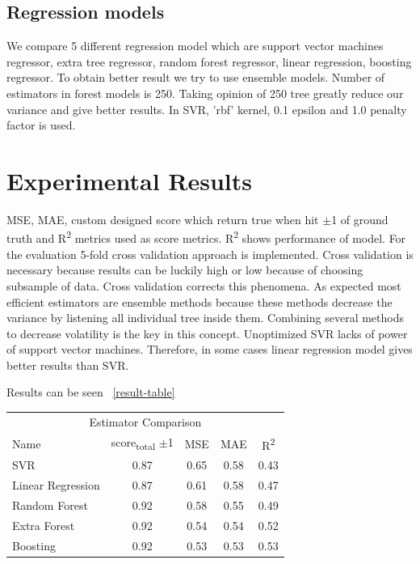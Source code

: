 \documentclass{article}
\begin{document}
\subsection{Regression models}
We compare 5 different regression model which are support vector machines regressor, extra tree regressor, random forest regressor, linear regression, boosting regressor. To obtain better result we try to use ensemble models.
Number of estimators in forest models is 250. Taking opinion of 250 tree greatly reduce our variance and give better results. 
In SVR, 'rbf' kernel, 0.1 epsilon and 1.0 penalty factor is used. 

\section{Experimental Results}
MSE, MAE, custom designed score which return true when hit $\pm$1 of ground truth and R\textsuperscript{2} metrics used as score metrics. R\textsuperscript{2} shows performance of model. For the evaluation 5-fold cross validation approach is implemented. Cross validation is necessary because results can be luckily high or low because of choosing subsample of data. Cross validation corrects this phenomena. As expected most efficient estimators are ensemble methods because these methods decrease the variance by listening all individual tree inside them. Combining several methods to decrease volatility is the key in this concept.
Unoptimized SVR lacks of power of support vector machines. Therefore, in some cases linear regression model gives better results than SVR. 

Results can be seen ~\ref{result-table}

\begin{table}[H]
  
  \centering
{}
{%
  \begin{tabular}{lcccc}
    \toprule
    \multicolumn{5}{c}{Estimator Comparison}                   \\
    \cmidrule{1-5}
    Name     & score\textsubscript{total} $\pm$1     & MSE 	& MAE	&R\textsuperscript{2}\\
    \midrule
    SVR					& 0.87  & 0.65	& 0.58	&0.43 \\
    Linear Regression   & 0.87 	& 0.61 	& 0.58	&0.47 \\
    Random Forest		& 0.92  & 0.58 	& 0.55 	&0.49 \\
    Extra Forest		& 0.92  & 0.54 	& 0.54 	&0.52 \\
    Boosting			& 0.92  & 0.53	& 0.53 	&0.53 \\

    \bottomrule
  \end{tabular}
  }%
  
\end{table}
\end{document}
